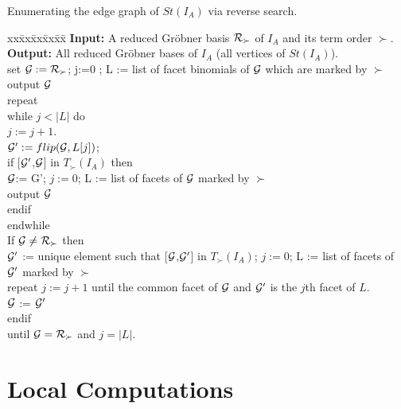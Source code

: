 \documentclass[11pt]{article}
\begin{document}
\begin{algorithm}
 Enumerating the edge graph of $St(I_A)$ via reverse search.
\begin{tabbing}
 xx\=xx\=xx\=xx\=xx\=\kill  
   {\bf Input:} A reduced Gr\"obner basis ${\cal R}_\succ$ of $I_A$ and its
                term order $\succ$.\\ 
   {\bf Output:} All reduced Gr\"obner bases of $I_A$ (all vertices of
$St(I_A)$).\\ 
   \> set ${\cal G} := {\cal R}_\succ$; j:=0 ; L := list of facet binomials of ${\cal G}$ which are marked by $\succ$\\
   \> output ${\cal G}$\\
   \> repeat \\
   \> \> while $j < |L|$ do \\
   \> \> \> $j := j + 1$.\\
   \> \> \> ${\cal G}':=flip({\cal G},L[j])$;\\
   \> \> \> if [${\cal G}'$,${\cal G}$] in $T_{\succ}(I_A)$ then\\
   \> \> \> \> ${\cal G}$:= {\cal G}'; $j := 0$; L := list of facets of
               ${\cal G}$ marked by $\succ$ \\
   \> \> \> \> output ${\cal G}$\\
   \> \> \>  endif\\
   \> \> endwhile\\
   \> \> If ${\cal G} \neq {\cal R}_{\succ}$ then\\
   \> \> \> ${\cal G}'$ := unique element such that [${\cal G}$,${\cal G}'$]
            in $T_{\succ}(I_A)$;
            $j:=0$; L := list of facets of ${\cal G}'$ marked by $\succ$\\
   \> \> \>repeat $j:=j+1$ until the common facet of ${\cal G}$ and ${\cal G'}$
           is the $j$th facet of $L$.\\
   \> \> \> ${\cal G}$ := ${\cal G}'$\\
   \> \> endif\\
   \> until ${\cal G} = {\cal R}_{\succ}$ and $j = |L|$.
\end{tabbing}
\end{algorithm}


\section{Local Computations}
\end{document}
